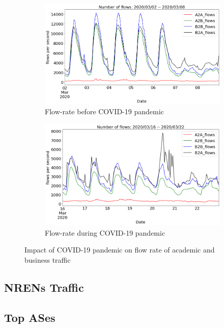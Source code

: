 \documentclass[10pt, journal, letterpaper]{IEEEtran}
\newcommand\linearFigSze{0.48}
\begin{document}
\begin{figure}
    \begin{subfigure}{\linearFigSze\textwidth}
          \centering
          \includegraphics[width=\columnwidth]{img/BCO2_acaBus_fps.png}
          \caption{Flow-rate before COVID-19 pandemic}
          \label{fig:BCO2_acaBus_fps}
    \end{subfigure}
    \begin{subfigure}{\linearFigSze\textwidth}
          \centering
          \includegraphics[width=\columnwidth]{img/CO2_acaBus_fps.png}
          \caption{Flow-rate during COVID-19 pandemic}
          \label{fig:CO2_acaBus_fps}
    \end{subfigure}
    \caption{Impact of COVID-19 pandemic on flow rate of academic and business traffic}
    \label{fig:flowrate_acaBus_BCO_CO}
\end{figure}
\subsection{NRENs Traffic}

\subsection{Top ASes}
\end{document}
